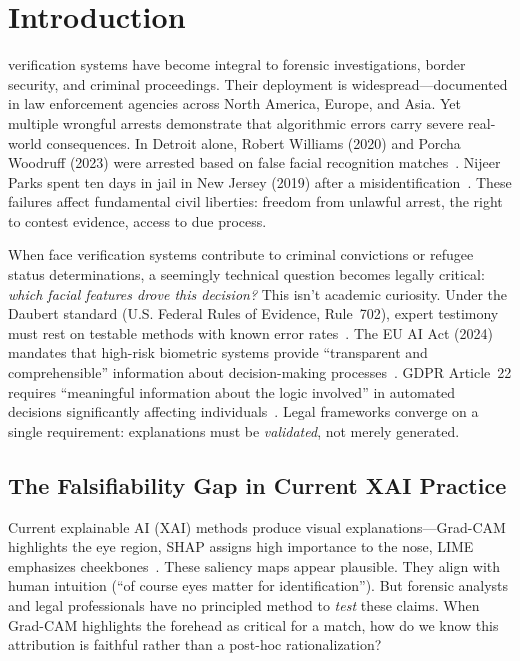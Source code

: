 
\section{Introduction}
\label{sec:introduction}

 verification systems have become integral to forensic investigations, border security, and criminal proceedings. Their deployment is widespread—documented in law enforcement agencies across North America, Europe, and Asia. Yet multiple wrongful arrests demonstrate that algorithmic errors carry severe real-world consequences. In Detroit alone, Robert Williams (2020) and Porcha Woodruff (2023) were arrested based on false facial recognition matches~\cite{williams2020case,woodruff2023case}. Nijeer Parks spent ten days in jail in New Jersey (2019) after a misidentification~\cite{parks2019case}. These failures affect fundamental civil liberties: freedom from unlawful arrest, the right to contest evidence, access to due process.

When face verification systems contribute to criminal convictions or refugee status determinations, a seemingly technical question becomes legally critical: \textit{which facial features drove this decision?} This isn't academic curiosity. Under the Daubert standard (U.S. Federal Rules of Evidence, Rule~702), expert testimony must rest on testable methods with known error rates~\cite{daubert1993}. The EU AI Act (2024) mandates that high-risk biometric systems provide ``transparent and comprehensible'' information about decision-making processes~\cite{euaiact2024}. GDPR Article~22 requires ``meaningful information about the logic involved'' in automated decisions significantly affecting individuals~\cite{gdpr2016}. Legal frameworks converge on a single requirement: explanations must be \textit{validated}, not merely generated.

\subsection{The Falsifiability Gap in Current XAI Practice}

Current explainable AI (XAI) methods produce visual explanations—Grad-CAM highlights the eye region, SHAP assigns high importance to the nose, LIME emphasizes cheekbones~\cite{selvaraju2017grad,lundberg2017shap,ribeiro2016lime}. These saliency maps appear plausible. They align with human intuition (``of course eyes matter for identification''). But forensic analysts and legal professionals have no principled method to \textit{test} these claims. When Grad-CAM highlights the forehead as critical for a match, how do we know this attribution is faithful rather than a post-hoc rationalization?

